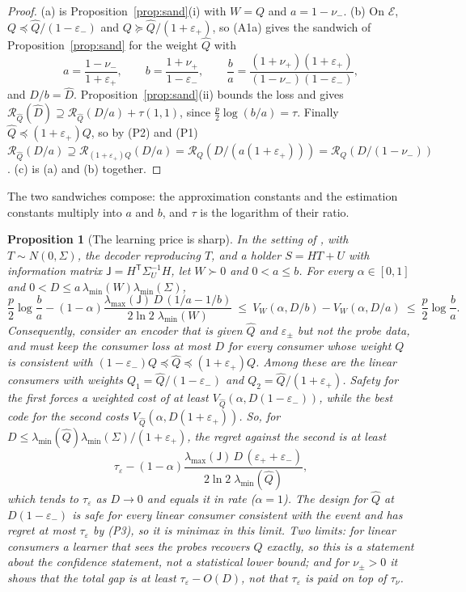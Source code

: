 \documentclass[11pt,onecolumn]{IEEEtran}
\newtheorem{proposition}[theorem]{Proposition}
\newcommand{\cR}{\mathcal R}
\newcommand{\nup}{\nu_{+}}
\newcommand{\num}{\nu_{-}}
\newcommand{\epp}{\varepsilon_{+}}
\newcommand{\emm}{\varepsilon_{-}}
\newcommand{\lmin}{\lambda_{\min}}
\newcommand{\lmax}{\lambda_{\max}}
\begin{document}
\begin{proof}
(a) is Proposition~\ref{prop:sand}(i) with $W=Q$ and $a=1-\num$.
(b) On $\mathcal E$, $Q\preceq\hat Q/(1-\emm)$ and $Q\succeq\hat Q/(1+\epp)$, so (A1a)
gives the sandwich of Proposition~\ref{prop:sand} for the weight $\hat Q$ with
\[
a=\frac{1-\num}{1+\epp},\qquad b=\frac{1+\nup}{1-\emm},\qquad \frac ba=\frac{(1+\nup)(1+\epp)}{(1-\num)(1-\emm)},
\]
and $D/b=\hat D$. Proposition~\ref{prop:sand}(ii) bounds the loss and gives
$\cR_{\hat Q}(\hat D)\supseteq\cR_{\hat Q}(D/a)+\tau(1,1)$, since
$\tfrac p2\log(b/a)=\tau$. Finally $\hat Q\preceq(1+\epp)Q$, so by (P2) and (P1)
$\cR_{\hat Q}(D/a)\supseteq\cR_{(1+\epp)Q}(D/a)=\cR_Q(D/(a(1+\epp)))=\cR_Q(D/(1-\num))$.
(c) is (a) and (b) together.
\end{proof}

The two sandwiches compose: the approximation constants and the estimation
constants multiply into $a$ and $b$, and $\tau$ is the logarithm of their ratio.

\begin{proposition}[The learning price is sharp]\label{prop:sharp}
In the setting of \cite{part1}, with $T\sim N(0,\Sigma)$, the decoder reproducing $T$,
and a holder $S=HT+U$ with information matrix $\mathsf J=H^{\mathsf T}\Sigma_U^{-1}H$,
let $W\succ0$ and $0<a\le b$. For every $\alpha\in[0,1]$ and
$0<D\le a\,\lmin(W)\lmin(\Sigma)$,
\[
\frac p2\log\frac ba-(1-\alpha)\frac{\lmax(\mathsf J)\,D\,(1/a-1/b)}{2\ln2\;\lmin(W)}
\ \le\ V_W(\alpha,D/b)-V_W(\alpha,D/a)\ \le\ \frac p2\log\frac ba .
\]
Consequently, consider an encoder that is given $\hat Q$ and $\varepsilon_\pm$ but not
the probe data, and must keep the consumer loss at most $D$ for every consumer whose
weight $Q$ is consistent with $(1-\emm)Q\preceq\hat Q\preceq(1+\epp)Q$. Among these are
the linear consumers with weights $Q_1=\hat Q/(1-\emm)$ and $Q_2=\hat Q/(1+\epp)$. Safety
for the first forces a weighted cost of at least $V_{\hat Q}(\alpha,D(1-\emm))$, while
the best code for the second costs $V_{\hat Q}(\alpha,D(1+\epp))$. So, for
$D\le\lmin(\hat Q)\lmin(\Sigma)/(1+\epp)$, the regret against the second is at least
\[
\tau_\varepsilon-(1-\alpha)\frac{\lmax(\mathsf J)\,D\,(\epp+\emm)}{2\ln2\;\lmin(\hat Q)},
\]
which tends to $\tau_\varepsilon$ as $D\to0$ and equals it in rate ($\alpha=1$). The
design for $\hat Q$ at $D(1-\emm)$ is safe for every linear consumer consistent with the
event and has regret at most $\tau_\varepsilon$ by (P3), so it is minimax in this limit.
Two limits: for linear consumers a learner that sees the probes recovers $Q$ exactly,
so this is a statement about the confidence statement, not a statistical lower bound;
and for $\nu_\pm>0$ it shows that the total gap is at least $\tau_\varepsilon-O(D)$, not
that $\tau_\varepsilon$ is paid on top of $\tau_\nu$.
\end{proposition}
\end{document}
